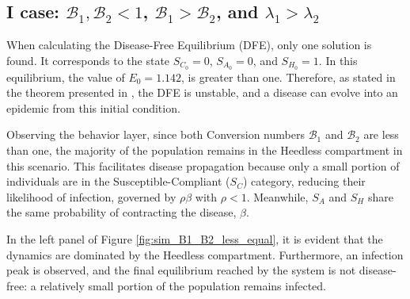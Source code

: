 \subsection{I case: $\mathcal{B}_1, \mathcal{B}_2 <1$, $\mathcal{B}_1 >  \mathcal{B}_2$, and $\lambda_1 > \lambda_2$}
When calculating the Disease-Free Equilibrium (DFE), only one solution is found. It corresponds to the state $S_{C_0} = 0$, $S_{A_0} = 0$, and $S_{H_0} = 1$. In this equilibrium, the value of $E_0 = 1.142$, is greater than one. Therefore, as stated in the theorem presented in \cite{van_den_Driessche_2017}, the DFE is unstable, and a disease can evolve into an epidemic from this initial condition.

Observing the behavior layer, since both Conversion numbers $\mathcal{B}_1$ and $\mathcal{B}_2$ are less than one, the majority of the population remains in the Heedless compartment in this scenario. This facilitates disease propagation because only a small portion of individuals are in the Susceptible-Compliant ($S_C$) category, reducing their likelihood of infection, governed by $\rho \beta$ with $\rho < 1$. Meanwhile, $S_A$ and $S_H$ share the same probability of contracting the disease, $\beta$.

In the left panel of Figure \ref{fig:sim_B1_B2_less_equal}, it is evident that the dynamics are dominated by the Heedless compartment. Furthermore, an infection peak is observed, and the final equilibrium reached by the system is not disease-free: a relatively small portion of the population remains infected.

